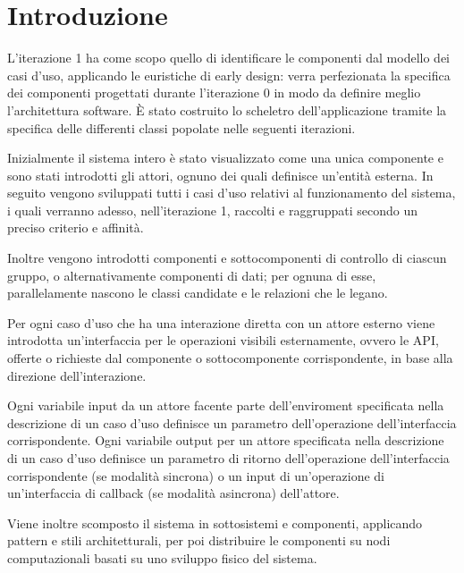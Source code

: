 \section{Introduzione}

L'iterazione 1 ha come scopo quello di identificare le componenti dal modello dei casi d'uso, applicando le euristiche di early design: 
verra perfezionata la specifica dei componenti progettati durante l'iterazione 0 in modo da definire meglio l'architettura software. 
È stato costruito lo scheletro dell'applicazione tramite la specifica delle differenti classi popolate nelle seguenti iterazioni.


Inizialmente il sistema intero è stato visualizzato come una unica componente e sono stati introdotti gli attori, ognuno dei quali 
definisce un'entità esterna. In seguito vengono sviluppati tutti i casi d'uso relativi al funzionamento del sistema, i quali verranno 
adesso, nell'iterazione 1, raccolti e raggruppati secondo un preciso criterio e affinità. 

Inoltre vengono introdotti componenti e sottocomponenti di controllo di ciascun gruppo, o alternativamente componenti di dati; 
per ognuna di esse, parallelamente nascono le classi candidate e le relazioni che le legano. 

Per ogni caso d'uso che ha una interazione diretta con un attore esterno viene introdotta un'interfaccia per le operazioni visibili 
esternamente, ovvero le API, offerte o richieste dal componente o sottocomponente corrispondente, in base alla direzione dell'interazione. 

Ogni variabile input da un attore facente parte dell'enviroment specificata nella descrizione di un caso d'uso definisce un parametro 
dell'operazione dell'interfaccia corrispondente. Ogni variabile output per un attore specificata nella descrizione di un caso d'uso 
definisce un parametro di ritorno dell'operazione dell'interfaccia corrispondente (se modalità sincrona) o un input di un'operazione 
di un'interfaccia di callback (se modalità asincrona) dell'attore. 

Viene inoltre scomposto il sistema in sottosistemi e componenti, applicando pattern e stili architetturali, per poi distribuire le 
componenti su nodi computazionali basati su uno sviluppo fisico del sistema.



\newpage
